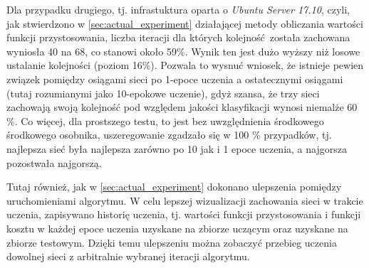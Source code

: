 Dla przypadku drugiego, tj. infrastuktura oparta o \textit{Ubuntu Server 17.10}, czyli, jak stwierdzono w \ref{sec:actual_experiment} działającej metody obliczania wartości funkcji przystosowania, liczba iteracji dla których kolejność została zachowana wyniosła 40 na 68, co stanowi około 59\%.
Wynik ten jest dużo wyższy niż losowe ustalanie kolejności (poziom 16\%).
Pozwala to wysnuć wniosek, że istnieje pewien związek pomiędzy osiągami sieci po 1-epoce uczenia a ostatecznymi osiągami (tutaj rozumianymi jako 10-epokowe uczenie), gdyż szansa, że trzy sieci zachowają swoją kolejność pod względem jakości klasyfikacji wynosi niemalże 60 \%.
Co więcej, dla prostszego testu, to jest bez uwzględnienia środkowego środkowego osobnika, uszeregowanie zgadzało się w 100 \% przypadków, tj. najlepsza sieć była najlepsza zarówno po 10 jak i 1 epoce uczenia, a najgorsza pozostwała najgorszą.

Tutaj również, jak w \ref{sec:actual_experiment} dokonano ulepszenia pomiędzy uruchomieniami algorytmu.
W celu lepszej wizualizacji zachowania sieci w trakcie uczenia, zapisywano historię uczenia, tj. wartości funkcji przystosowania i funkcji kosztu w każdej epoce uczenia uzyskane na zbiorze uczącym oraz uzyskane na zbiorze testowym.
Dzięki temu ulepszeniu można zobaczyć przebieg uczenia dowolnej sieci z arbitralnie wybranej iteracji algorytmu.

